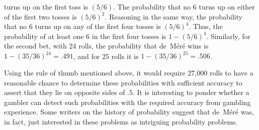 turns up on the first toss is $(5/6)$.  The probability that no 6 turns up on
either of the first two tosses is $(5/6)^2$.  Reasoning in the same way, the
probability that no 6 turns up on any of the first four tosses is $(5/6)^4$. 
Thus, the probability of at least one 6 in the first four tosses is $1 -
(5/6)^4$.  Similarly, for the second bet, with 24 rolls, the probability that
de~M\'er\'e
wins is $1 - (35/36)^{24} = .491$, and for 25 rolls it is $1 - (35/36)^{25}
= .506$.  
\par
Using the rule of thumb mentioned above, it
would require 27,000 rolls to have a reasonable chance to determine these probabilities with
sufficient accuracy to assert that they lie on opposite sides of .5.  It is interesting to ponder
whether a gambler can detect such probabilities with the required accuracy from gambling
experience.  Some writers on the history of probability suggest that de~M\'er\'e was, in
fact, just interested in these problems as intriguing probability problems.


